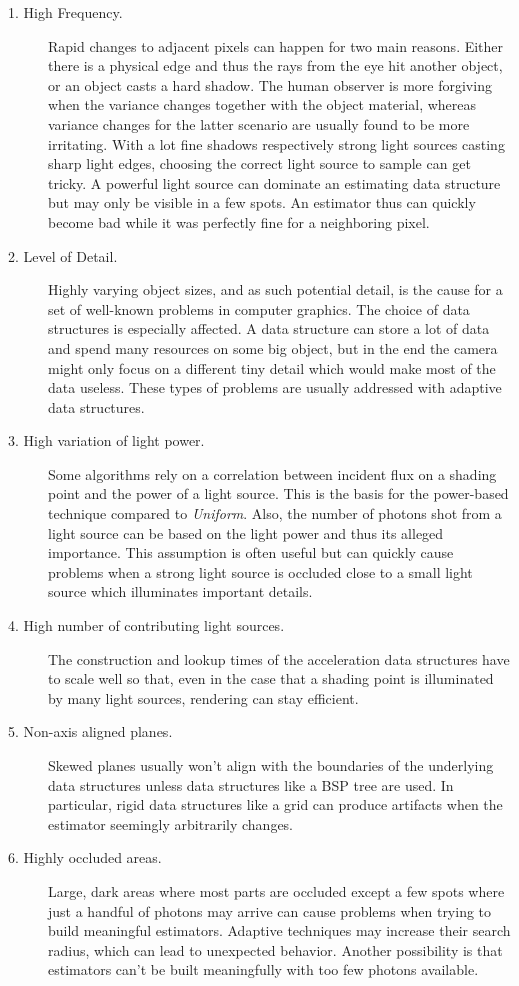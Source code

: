 \begin{description}
    \item[1. High Frequency.] Rapid changes to adjacent pixels can happen for two main reasons. Either there is a physical edge and thus the rays from the eye hit another object, or an object casts a hard shadow. The human observer is more forgiving when the variance changes together with the object material, whereas variance changes for the latter scenario are usually found to be more irritating. With a lot fine shadows respectively strong light sources casting sharp light edges, choosing the correct light source to sample can get tricky. A powerful light source can dominate an estimating data structure but may only be visible in a few spots. An estimator thus can quickly become bad while it was perfectly fine for a neighboring pixel. 
    \item[2. Level of Detail.] Highly varying object sizes, and as such potential detail, is the cause for a set of well-known problems in computer graphics. The choice of data structures is especially affected. A data structure can store a lot of data and spend many resources on some big object, but in the end the camera might only focus on a different tiny detail which would make most of the data useless. These types of problems are usually addressed with adaptive data structures.
    \item[3. High variation of light power.] Some algorithms rely on a correlation between incident flux on a shading point and the power of a light source. This is the basis for the power-based technique compared to \textit{Uniform}. Also, the number of photons shot from a light source can be based on the light power and thus its alleged importance. This assumption is often useful but can quickly cause problems when a strong light source is occluded close to a small light source which illuminates important details.
    \item[4. High number of contributing light sources.] The construction and lookup times of the acceleration data structures have to scale well so that, even in the case that a shading point is illuminated by many light sources, rendering can stay efficient.
    \item[5. Non-axis aligned planes.] Skewed planes usually won't align with the boundaries of the underlying data structures unless data structures like a BSP tree are used. In particular, rigid data structures like a grid can produce artifacts when the estimator seemingly arbitrarily changes. 
    \item[6. Highly occluded areas.] Large, dark areas where most parts are occluded except a few spots where just a handful of photons may arrive can cause problems when trying to build meaningful estimators. Adaptive techniques may increase their search radius, which can lead to unexpected behavior. Another possibility is that estimators can't be built meaningfully with too few photons available.

\end{description}
